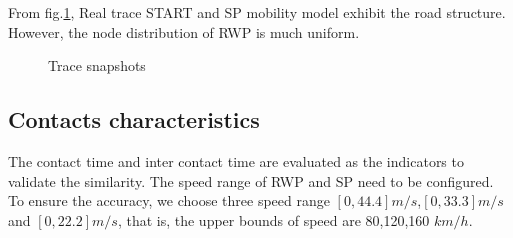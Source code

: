 From fig.\ref{figure_trace_snapshots}, Real trace START and SP mobility model exhibit the road structure. However, the node distribution of RWP is much uniform.
\begin{figure}
\centering
{}
\caption{Trace snapshots}\label{figure_trace_snapshots}
\end{figure}



\subsection{Contacts characteristics}

The contact time and inter contact time are evaluated as the indicators to validate the similarity. The speed range of RWP and SP need to be configured. To ensure the accuracy, we choose three speed range $[0,44.4]m/s$,$[0,33.3]m/s$ and $[0,22.2]m/s$, that is, the upper bounds of speed are 80,120,160 $km/h$.


